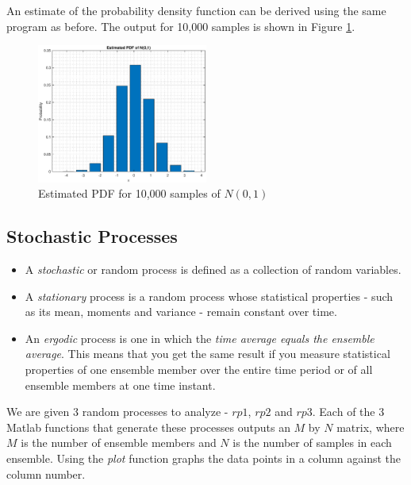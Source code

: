 \documentclass{article}
\begin{document}
An estimate of the probability density function can be derived using the same program as before. The output for 10,000 samples is shown in Figure \ref{fig:pdf_gaussian}.

\begin{figure}[h!]
\centering
\includegraphics[width=0.5\textwidth]{pdf_gaussian}
\caption{\label{fig:pdf_gaussian} Estimated PDF for 10,000 samples of $N(0,1)$}
\end{figure}


\pagebreak

\subsection{Stochastic Processes}

\begin{itemize}
\item A \textit{stochastic} or random process is defined as a collection of random variables.

\item A \textit{stationary} process is a random process whose statistical properties - such as its mean, moments and variance - remain constant over time.

\item An \textit{ergodic} process is one in which the \textit{time average equals the ensemble average}. This means that you get the same result if you measure statistical properties of one ensemble member over the entire time period or of all ensemble members at one time instant.
\end{itemize}

We are given 3 random processes to analyze - $rp1$, $rp2$ and $rp3$. Each of the 3 Matlab functions that generate these processes outputs an $M$ by $N$ matrix, where $M$ is the number of ensemble members and $N$ is the number of samples in each ensemble. Using the \textit{plot} function graphs the data points in a column against the column number.
\end{document}
